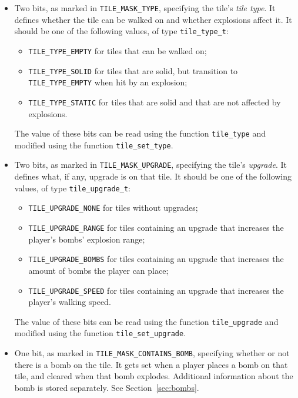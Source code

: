 \begin{itemize}
\item Two bits, as marked in \texttt{TILE\_MASK\_TYPE}, specifying the tile's
  \emph{tile type}. It defines whether the tile can be walked on and whether
  explosions affect it. It should be one of the following values, of type
  \texttt{tile\_type\_t}:

  \begin{itemize}
  \item \texttt{TILE\_TYPE\_EMPTY} for tiles that can be walked on;
  \item \texttt{TILE\_TYPE\_SOLID} for tiles that are solid, but transition to
    \texttt{TILE\_TYPE\_EMPTY} when hit by an explosion;
  \item \texttt{TILE\_TYPE\_STATIC} for tiles that are solid and that are not
    affected by explosions.
  \end{itemize}

  The value of these bits can be read using the function \texttt{tile\_type}
  and modified using the function \texttt{tile\_set\_type}.

\item Two bits, as marked in \texttt{TILE\_MASK\_UPGRADE}, specifying the
  tile's \emph{upgrade}. It defines what, if any, upgrade is on that tile. It
  should be one of the following values, of type \texttt{tile\_upgrade\_t}:

  \begin{itemize}
  \item \texttt{TILE\_UPGRADE\_NONE} for tiles without upgrades;
  \item \texttt{TILE\_UPGRADE\_RANGE} for tiles containing an upgrade that
    increases the player's bombs' explosion range;
  \item \texttt{TILE\_UPGRADE\_BOMBS} for tiles containing an upgrade that
    increases the amount of bombs the player can place;
  \item \texttt{TILE\_UPGRADE\_SPEED} for tiles containing an upgrade that
    increases the player's walking speed.
  \end{itemize}

  The value of these bits can be read using the function \texttt{tile\_upgrade}
  and modified using the function \texttt{tile\_set\_upgrade}.

\item One bit, as marked in \texttt{TILE\_MASK\_CONTAINS\_BOMB}, specifying
  whether or not there is a bomb on the tile. It gets set when a player places
  a bomb on that tile, and cleared when that bomb explodes. Additional
  information about the bomb is stored separately. See Section~\ref{sec:bombs}.


\end{itemize}
